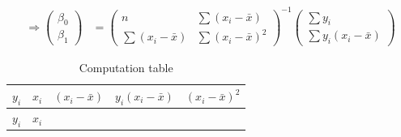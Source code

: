 \documentclass[
]{article}
\begin{document}
\begin{align*}
  \Rightarrow
    \begin{pmatrix}
      \beta_0\\
      \beta_1
    \end{pmatrix}
    & =
    \begin{pmatrix}
    n & \sum (x_i - \bar{x})\\
    \sum (x_i - \bar{x}) & \sum {(x_i - \bar{x})}^2
  \end{pmatrix}^{-1}
  
  \begin{pmatrix}
    \sum y_i \\
      \sum y_i (x_i - \bar{x})
  \end{pmatrix}
\end{align*}

\begin{longtable}[]{@{}
  >{\centering\arraybackslash}p{}
  >{\centering\arraybackslash}p{}
  >{\centering\arraybackslash}p{}
  >{\centering\arraybackslash}p{}
  >{\centering\arraybackslash}p{}@{}}
\caption{Computation table}\tabularnewline
\toprule\noalign{}
\begin{minipage}[b]{\linewidth}\centering
\(y_i\)
\end{minipage} & \begin{minipage}[b]{\linewidth}\centering
\(x_i\)
\end{minipage} & \begin{minipage}[b]{\linewidth}\centering
\((x_i - \bar{x})\)
\end{minipage} & \begin{minipage}[b]{\linewidth}\centering
\(y_i(x_i - \bar{x})\)
\end{minipage} & \begin{minipage}[b]{\linewidth}\centering
\((x_i - \bar{x})^2\)
\end{minipage} \\
\midrule\noalign{}
\endfirsthead
\toprule\noalign{}
\begin{minipage}[b]{\linewidth}\centering
\(y_i\)
\end{minipage} & \begin{minipage}[b]{\linewidth}\centering
\(x_i\)
\end{minipage} & \begin{minipage}[b]{\linewidth}\centering

\end{minipage}
\end{longtable}
\end{document}
